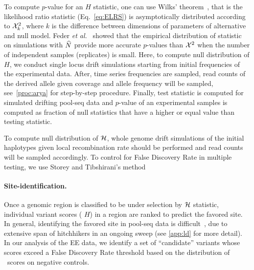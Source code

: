 To compute $p$-value for an $H$ statistic, one can use Wilks’ 
theorem~\cite{williams2001weighing}, that is the likelihood
ratio statistic (Eq.~\ref{eq:ELRS}) is asymptotically distributed
according to ${\cal X}^2_k$, where $k$ is the difference between dimensions of 
parameters of alternative and null model. Feder \emph{et
	al.}~\cite{feder2014Identifying} showed that the empirical
distribution of statistic on simulations with $\widehat{N}$ provide more accurate 
$p$-values than ${\cal X}^2$ when the
number of independent samples (replicates) is small. Here, to compute null 
distribution of $H$, we conduct single locus drift simulations starting from 
initial frequencies of the experimental data. After, time series frequencies are 
sampled, read counts of the derived allele given coverage and allele frequency 
will be sampled, see~\ref{proc:arya} for step-by-step procedure. Finally, test 
statistic is computed for simulated drifting pool-seq data and $p$-value of an 
experimental samples is computed as fraction of null statistics that have a 
higher or equal value than testing statistic.

To compute null distribution of ${\cal H}$, whole genome drift simulations of the 
initial haplotypes given local recombination rate should be performed and read 
counts will be sampled accordingly.
To control for False Discovery Rate in multiple testing, we use Storey and 
Tibshirani's method\cite{storey2003statistical} 

\paragraph{Site-identification.} 
Once a genomic region is classified to be under selection by ${\cal H}$ 
statistic,
individual variant scores ( $H$) in a region are ranked to predict the
favored site. In general, identifying the favored site in pool-seq
data is difficult~\cite{tobler2014massive}, due to extensive span of
hitchhikers in an ongoing sweep (see \ref{app:ld} for 
more
detail). In our analysis of the \dmel EE data, we identify a set of
``candidate'' variants whose scores exceed a False Discovery Rate
threshold based on the distribution of \comale\ scores on negative
controls.

